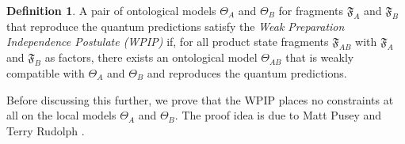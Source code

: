 \documentclass[DIV=calc,fontsize=12pt]{scrartcl} %
\theoremstyle{definition}
\newtheorem{definition}{Definition}[section]
\theoremstyle{plain}
\begin{document}
\begin{definition}
A pair of ontological models $\Theta_A$ and $\Theta_B$ for fragments
$\mathfrak{F}_A$ and $\mathfrak{F}_B$ that reproduce the quantum
predictions satisfy the \emph{Weak Preparation Independence
Postulate (WPIP)} if, for all product state fragments
$\mathfrak{F}_{AB}$ with $\mathfrak{F}_A$ and $\mathfrak{F}_B$ as
factors, there exists an ontological model $\Theta_{AB}$ that is
weakly compatible with $\Theta_A$ and $\Theta_B$ and reproduces the
quantum predictions.
\end{definition}

Before discussing this further, we prove that the WPIP places no
constraints at all on the local models $\Theta_A$ and $\Theta_B$.  The
proof idea is due to Matt Pusey and Terry Rudolph \cite{Pusey2013}.
\end{document}
